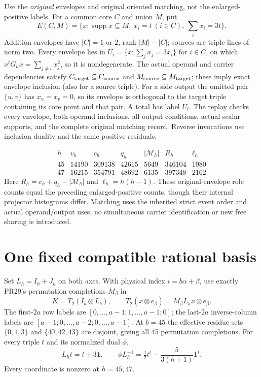 \documentclass[11pt]{article}
\begin{document}
Use the \emph{original} envelopes and original oriented matching, not the
enlarged-positive labels. For a common core $C$ and union $M$, put
\[
 E(C,M)=\{x:\operatorname{supp}x\subseteq M,\ x_i=t\ (i\in C),\
                  \textstyle\sum_i x_i=3t\}.
\]
Addition envelopes have $|C|=1$ or $2$, rank $|M|-|C|$; sources are triple
lines of norm two. Every envelope lies in
$U_i=\{x:\sum_jx_j=3x_i\}$ for $i\in C$, on which
$x^tG_hx=\sum_{j\ne i}x_j^2$, so it is nondegenerate.
The actual operand and carrier dependencies satisfy
$C_{\rm target}\subseteq C_{\rm source}$ and
$M_{\rm source}\subseteq M_{\rm target}$; these imply exact envelope
inclusion (also for a source triple). For a side output the omitted pair
$\{u,v\}$ has $x_u=x_v=0$, so its envelope is orthogonal to the target
triple containing its core point and that pair. A total has label $U_i$.
The replay checks every envelope, both operand inclusions, all output
conditions, actual scalar supports, and the complete original matching record.
Reverse invocations use inclusion duality and the same positive residuals.

\[
\begin{array}{c|rrrrrr}
h&v_h&c_h&q_h&|\mathcal M_h|&R_h&\ell_h\\\hline
45&14190&309138&42615&5649&346104&1980\\
47&16215&354791&48692&6135&397348&2162
\end{array}
\]
Here $R_h=c_h+q_h-|\mathcal M_h|$ and $\ell_h=h(h-1)$.
These original-envelope role counts equal the preceding enlarged-positive
counts, though their internal projector histograms differ. Matching uses the
inherited strict event order and actual operand/output uses; no simultaneous
carrier identification or new free sharing is introduced.

\section{One fixed compatible rational basis}
Set $L_h=I_h+J_h$ on both axes. With physical index $i=b\alpha+\beta$, use
exactly PR29's permutation completions $M_\beta$ in
\[
 K=T_2(I_a\otimes L_b),\qquad
 T_2(x\otimes e_\beta)=M_\beta L_ax\otimes e_\beta.
\]
The first-$2a$ row labels are $[0,\ldots,a-1;1,\ldots,a-1;0]$;
the last-$2a$ inverse-column labels are
$[a-1;0,\ldots,a-2;0,\ldots,a-1]$. At $b=45$ the effective residue sets
$\{0,1,3\}$ and $\{40,42,43\}$ are disjoint, giving all 45 permutation
completions. For every triple $t$ and its normalized dual $\phi$,
\[
 L_ht=t+3\mathbf1,\qquad
 \phi L_h^{-1}=\tfrac12t^t-\frac5{3(h+1)}\mathbf1^t.
\]
Every coordinate is nonzero at $h=45,47$.
\end{document}
